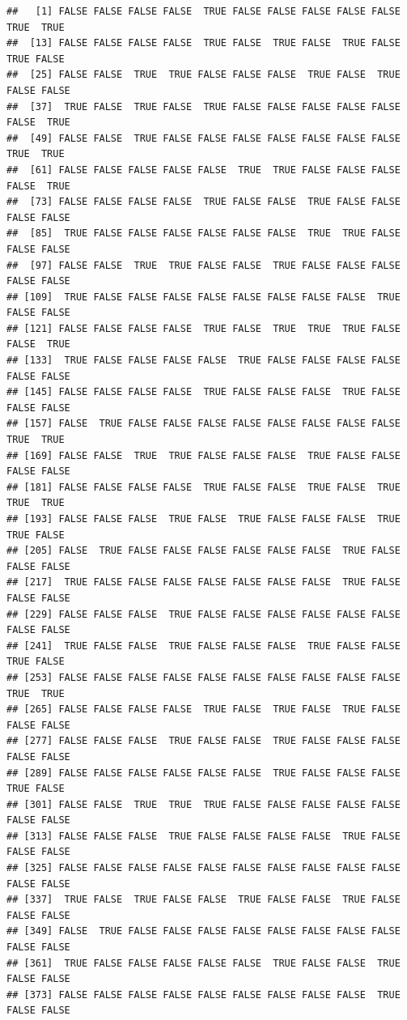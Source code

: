 \documentclass[
]{article}
\begin{document}
\begin{verbatim}
##   [1] FALSE FALSE FALSE FALSE  TRUE FALSE FALSE FALSE FALSE FALSE  TRUE  TRUE
##  [13] FALSE FALSE FALSE FALSE  TRUE FALSE  TRUE FALSE  TRUE FALSE  TRUE FALSE
##  [25] FALSE FALSE  TRUE  TRUE FALSE FALSE FALSE  TRUE FALSE  TRUE FALSE FALSE
##  [37]  TRUE FALSE  TRUE FALSE  TRUE FALSE FALSE FALSE FALSE FALSE FALSE  TRUE
##  [49] FALSE FALSE  TRUE FALSE FALSE FALSE FALSE FALSE FALSE FALSE  TRUE  TRUE
##  [61] FALSE FALSE FALSE FALSE FALSE  TRUE  TRUE FALSE FALSE FALSE FALSE  TRUE
##  [73] FALSE FALSE FALSE FALSE  TRUE FALSE FALSE  TRUE FALSE FALSE FALSE FALSE
##  [85]  TRUE FALSE FALSE FALSE FALSE FALSE FALSE  TRUE  TRUE FALSE FALSE FALSE
##  [97] FALSE FALSE  TRUE  TRUE FALSE FALSE  TRUE FALSE FALSE FALSE FALSE FALSE
## [109]  TRUE FALSE FALSE FALSE FALSE FALSE FALSE FALSE FALSE  TRUE FALSE FALSE
## [121] FALSE FALSE FALSE FALSE  TRUE FALSE  TRUE  TRUE  TRUE FALSE FALSE  TRUE
## [133]  TRUE FALSE FALSE FALSE FALSE  TRUE FALSE FALSE FALSE FALSE FALSE FALSE
## [145] FALSE FALSE FALSE FALSE  TRUE FALSE FALSE FALSE  TRUE FALSE FALSE FALSE
## [157] FALSE  TRUE FALSE FALSE FALSE FALSE FALSE FALSE FALSE FALSE  TRUE  TRUE
## [169] FALSE FALSE  TRUE  TRUE FALSE FALSE FALSE  TRUE FALSE FALSE FALSE FALSE
## [181] FALSE FALSE FALSE FALSE  TRUE FALSE FALSE  TRUE FALSE  TRUE  TRUE  TRUE
## [193] FALSE FALSE FALSE  TRUE FALSE  TRUE FALSE FALSE FALSE  TRUE  TRUE FALSE
## [205] FALSE  TRUE FALSE FALSE FALSE FALSE FALSE FALSE  TRUE FALSE FALSE FALSE
## [217]  TRUE FALSE FALSE FALSE FALSE FALSE FALSE FALSE  TRUE FALSE FALSE FALSE
## [229] FALSE FALSE FALSE  TRUE FALSE FALSE FALSE FALSE FALSE FALSE FALSE FALSE
## [241]  TRUE FALSE FALSE  TRUE FALSE FALSE FALSE  TRUE FALSE FALSE  TRUE FALSE
## [253] FALSE FALSE FALSE FALSE FALSE FALSE FALSE FALSE FALSE FALSE  TRUE  TRUE
## [265] FALSE FALSE FALSE FALSE  TRUE FALSE  TRUE FALSE  TRUE FALSE FALSE FALSE
## [277] FALSE FALSE FALSE  TRUE FALSE FALSE  TRUE FALSE FALSE FALSE FALSE FALSE
## [289] FALSE FALSE FALSE FALSE FALSE FALSE  TRUE FALSE FALSE FALSE  TRUE FALSE
## [301] FALSE FALSE  TRUE  TRUE  TRUE FALSE FALSE FALSE FALSE FALSE FALSE FALSE
## [313] FALSE FALSE FALSE  TRUE FALSE FALSE FALSE FALSE  TRUE FALSE FALSE FALSE
## [325] FALSE FALSE FALSE FALSE FALSE FALSE FALSE FALSE FALSE FALSE FALSE FALSE
## [337]  TRUE FALSE  TRUE FALSE FALSE  TRUE FALSE FALSE  TRUE FALSE FALSE FALSE
## [349] FALSE  TRUE FALSE FALSE FALSE FALSE FALSE FALSE FALSE FALSE FALSE FALSE
## [361]  TRUE FALSE FALSE FALSE FALSE FALSE  TRUE FALSE FALSE  TRUE FALSE FALSE
## [373] FALSE FALSE FALSE FALSE FALSE FALSE FALSE FALSE FALSE  TRUE FALSE FALSE

\end{verbatim}
\end{document}
